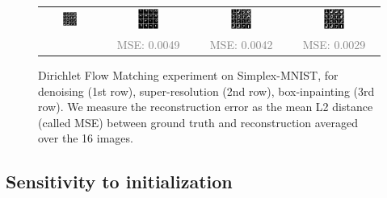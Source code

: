 \documentclass{article} %
\theoremstyle{definition}
\begin{document}
\begin{figure}[htp]
\begin{adjustbox}{max width=0.8\textwidth}
\begin{tabular}{cccc}
    \includegraphics[width=0.25\textwidth]{figures/diri/groundtruth_inp.png} &  \includegraphics[width=0.25\textwidth]{figures/diri/measurements_inp.png} &     \includegraphics[width=0.25\textwidth]{figures/diri/Dreco_inp.png} & \includegraphics[width=0.25\textwidth]{figures/diri/reco_inp.png} \\
    & \textcolor{gray}{MSE: 0.0049} & \textcolor{gray}{MSE: 0.0042}& \textcolor{gray}{MSE: 0.0029}
    \end{tabular}
    \end{adjustbox}
    \caption{Dirichlet Flow Matching experiment on Simplex-MNIST, for denoising (1st row), super-resolution (2nd row), box-inpainting (3rd row). We measure the reconstruction error as the mean L2 distance (called MSE) between ground truth and reconstruction averaged over the 16 images.}
    \label{fig:diri}
\end{figure}




\subsection{Sensitivity to initialization}\label{sec:app_sensitivity}
\end{document}
